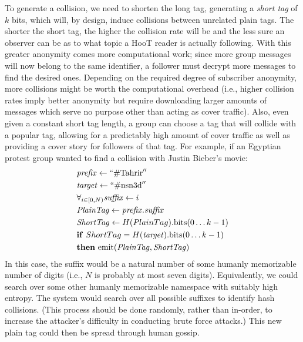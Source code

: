 To generate a collision, we need to shorten the long tag, generating a \textit{short tag} of $k$ bits, which will, by design, induce collisions between unrelated plain tags. The shorter the short tag, the higher the collision rate will be and the less sure an observer can be as to what topic a HooT reader is actually following. With this greater anonymity comes more computational work; since more group messages will now belong to the same identifier, a follower must decrypt more messages to find the desired ones. Depending on the required degree of subscriber anonymity, more collisions might be worth the computational overhead (i.e., higher collision rates imply better anonymity but require downloading larger amounts of messages which serve no purpose other than acting as cover traffic). Also, even given a constant short tag length, a group can choose a tag that will collide with a popular tag, allowing for a predictably high amount of cover traffic as well as providing a cover story for followers of that tag. For example, if an Egyptian protest group wanted to find a collision with Justin Bieber's movie:
%
\begin{align*}
& \mathit{prefix} \leftarrow  ``\mathrm{\#Tahrir}'' \\
& \mathit{target} \leftarrow ``\mathrm{\#nsn3d}'' \\
& \forall_{i \in [0, N)}  \mathit{suffix} \leftarrow i \\
& \mathit{PlainTag} \leftarrow  \mathit{prefix}.\mathit{suffix} \\
& \mathit{ShortTag} \leftarrow H({\mathit PlainTag}).\mathrm{bits}(0 \ldots k-1) \\
& \mathbf{if}\ {\mathit ShortTag} = H(\mathit{target}).\mathrm{bits}(0 \ldots k-1)\\
& \mathbf{then}\ \mathrm{emit} (\mathit{PlainTag} , {\mathit{ShortTag}}) 
\end{align*}
%
In this case, the suffix would be a natural number of some humanly memorizable number of digits (i.e., $N$ is probably at most seven digits). Equivalently, we could search over some other humanly memorizable namespace with suitably high entropy. The system would search over all possible suffixes to identify hash collisions. (This process should be done randomly, rather than in-order, to increase the attacker's difficulty in conducting brute force attacks.) This new plain tag could then be spread through human gossip.


